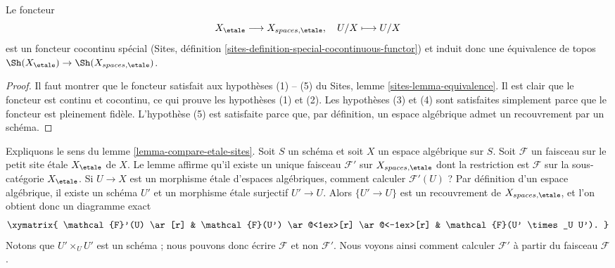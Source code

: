 \begin{lemma}
\label{lemma-compare-etale-sites}
Le foncteur
$$
X_\etale \longrightarrow X_{spaces, \etale}, \quad
U/X \longmapsto U/X
$$
est un foncteur cocontinu spécial
(Sites, définition \ref{sites-definition-special-cocontinuous-functor})
et induit donc une équivalence de topos
$\Sh(X_\etale) \to \Sh(X_{spaces, \etale})$.
\end{lemma}

\begin{proof}
Il faut montrer que le foncteur satisfait aux hypothèses (1) -- (5) du
Sites, lemme \ref{sites-lemma-equivalence}.
Il est clair que le foncteur est continu et cocontinu, ce qui
prouve les hypothèses (1) et (2).
Les hypothèses (3) et (4) sont satisfaites simplement parce que le foncteur est pleinement fidèle.
L'hypothèse (5) est satisfaite parce que, par définition, un espace algébrique admet
un recouvrement par un schéma.
\end{proof}

\begin{remark}
\label{remark-explain-equivalence}
Expliquons le sens du lemme \ref{lemma-compare-etale-sites}.
Soit $S$ un schéma et soit $X$ un espace algébrique sur $S$.
Soit $\mathcal{F}$ un faisceau sur le petit site \'etale $X_\etale$ de
$X$. Le lemme affirme qu'il existe un unique faisceau $\mathcal{F}'$ sur
$X_{spaces, \etale}$ dont la restriction est $\mathcal{F}$ sur la
sous-catégorie $X_\etale$. Si $U \to X$ est un morphisme \'etale
d'espaces algébriques, comment calculer $\mathcal{F}'(U)$ ? Par définition
d'un espace algébrique, il existe un schéma $U'$ et un morphisme
\'etale surjectif $U' \to U$. Alors $\{U' \to U\}$ est un recouvrement de
$X_{spaces, \etale}$, et l'on obtient donc un diagramme exact
$$
\xymatrix{
\mathcal{F}'(U) \ar[r] &
\mathcal{F}(U') \ar@<1ex>[r] \ar@<-1ex>[r] &
\mathcal{F}(U' \times_U U').
}
$$
Notons que $U' \times_U U'$ est un schéma ; nous pouvons donc
écrire $\mathcal{F}$ et non $\mathcal{F}'$.
Nous voyons ainsi comment calculer $\mathcal{F}'$
à partir du faisceau $\mathcal{F}$.
\end{remark}

